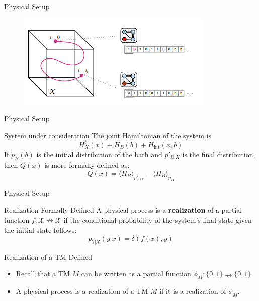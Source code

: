 \documentclass{beamer}
\begin{document}
\begin{frame}{Physical Setup}

    \begin{figure}
            \centering
            \includegraphics{System.png}
            \label{fig:my_label2}
        \end{figure}
    
\end{frame}

\begin{frame}{Physical Setup}
\begin{block}{System under consideration}
The joint Hamiltonian of the system is
\begin{equation*}
    H_X^t(x) + H_B(b) + H_{\text{int}}(x,b)
\end{equation*}
If $p_B(b)$ is the initial distribution of the bath and $p'_{B|X}$ is the final distribution, then $Q(x)$ is more formally defined as:
\begin{equation*}
    Q(x) = \langle H_B \rangle_{p'_{B|x}} - \langle H_B \rangle_{p_B}
\end{equation*}
\end{block}
\end{frame}

\begin{frame}{Physical Setup}
    \begin{block}{Realization Formally Defined}
    A physical process is a \textbf{realization} of a partial function $f:\mathcal{X}\nrightarrow\mathcal{X}$ if the conditional probability of the system's final state given the initial state follows:
    \begin{equation*}
        p_{Y|X}(y|x) = \delta(f(x), y)
    \end{equation*}
    \end{block}
    
\begin{block}{Realization of a TM Defined}
\begin{itemize}
    \item Recall that a TM $M$ can be written as a partial function $\phi_M:\{0,1\} \nrightarrow \{0,1\}$
    \item A physical process is a realization of a TM $M$ if it is a realization of $\phi_M$.
\end{itemize}
\end{block}
\end{frame}
\end{document}
